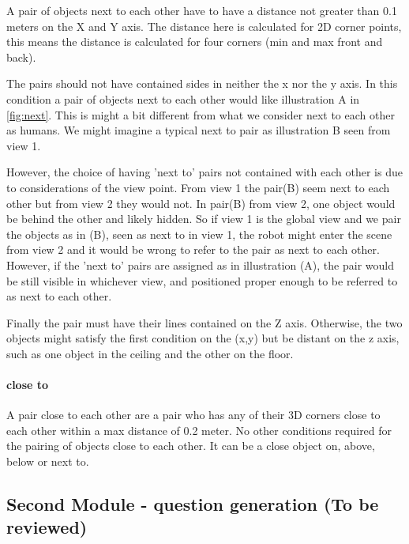 A pair of objects next to each other have to have a distance not greater than 0.1 meters on the X and Y axis. The distance here is calculated for 2D corner points, this means the distance is calculated for four corners (min and max front and back).

The pairs should not have contained sides in neither the x nor the y axis. In this condition a pair of objects next to each other would like illustration A in \ref{fig:next}. This is might a bit different from what we consider next to each other as humans. We might imagine a typical next to pair as illustration B seen from view 1.

However, the choice of having 'next to' pairs not contained with each other is due to considerations of the view point. From view 1 the pair(B) seem next to each other but from view 2 they would not. In pair(B) from view 2, one object would be behind the other and likely hidden. So if view 1 is the global view and we pair the objects as in (B), seen as next to in view 1, the robot might enter the scene from view 2 and it would be wrong to refer to the pair as next to each other. However, if the 'next to' pairs are assigned as in illustration (A), the pair would be still visible in whichever view, and positioned proper enough to be referred to as next to each other. 

Finally the pair must have their lines contained on the Z axis. Otherwise, the two objects might satisfy the first condition on the (x,y) but be distant on the z axis, such as one object in the ceiling and the other on the floor. 


\paragraph{close to}

A pair close to each other are a pair who has any of their 3D corners close to each other within a max distance of 0.2 meter. No other conditions required for the pairing of objects close to each other. It can be a close object on, above, below or next to. 

\subsection{Second Module - question generation (To be reviewed)}



